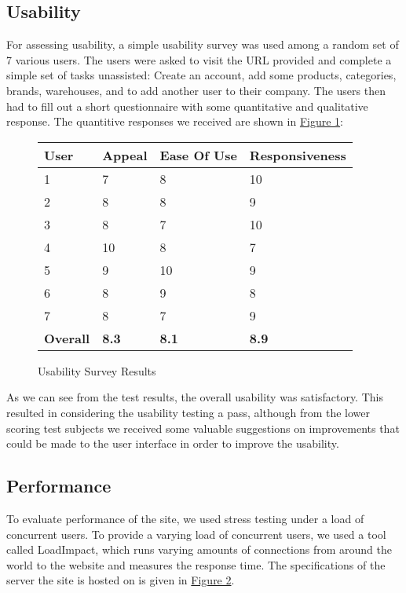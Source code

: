 \documentclass[12pt, titlepage]{article}
\begin{document}
\subsection{Usability}
For assessing usability, a simple usability survey was used among a random set of 7 various users. The users were asked to visit the URL provided and complete a simple set of tasks unassisted: Create an account, add some products, categories, brands, warehouses, and to add another user to their company. The users then had to fill out a short questionnaire with some quantitative and qualitative response. The quantitive responses we received are shown in \hyperref[fig:table1]{Figure 1}:
\begin{figure}[h]
\centering
\begin{tabular}{| p{2cm} | p{3cm} | p{3cm} | p{3cm} |}
\hline
\textbf{User} & \textbf{Appeal} & \textbf{Ease Of Use} & \textbf{Responsiveness}\\
\hline
1 & 7 & 8 & 10\\ \hline
2 & 8 & 8 & 9\\ \hline
3 & 8 & 7 & 10\\ \hline
4 & 10 & 8 & 7\\ \hline
5 & 9 & 10 & 9\\ \hline
6 & 8 & 9 & 8\\ \hline
7 & 8 & 7 & 9\\ \hline\hline
\textbf{Overall} & \textbf{8.3} & \textbf{8.1} & \textbf{8.9}\\ \hline
\end{tabular}
\caption{Usability Survey Results}
\label{fig:table1}
\end{figure}

As we can see from the test results, the overall usability was satisfactory. This resulted in considering the usability testing a pass, although from the lower scoring test subjects we received some valuable suggestions on improvements that could be made to the user interface in order to improve the usability.
		
\subsection{Performance}
\label{sec:performance}
To evaluate performance of the site, we used stress testing under a load of concurrent users. To provide a varying load of concurrent users, we used a tool called LoadImpact, which runs varying amounts of connections from around the world to the website and measures the response time. The specifications of the server the site is hosted on is given in \hyperref[fig:table2]{Figure 2}.\\
\end{document}
